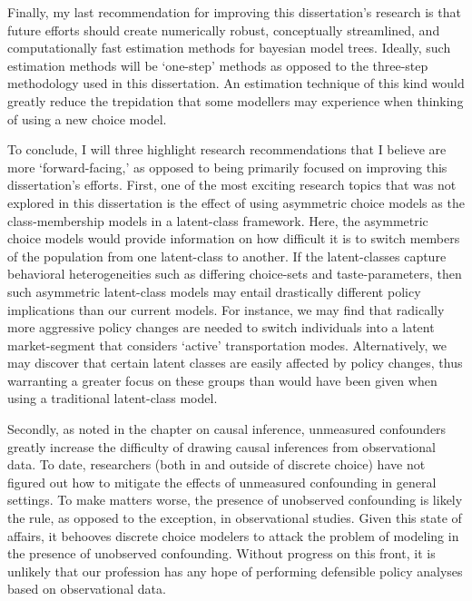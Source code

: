 Finally, my last recommendation for improving this dissertation's research is that future efforts should create numerically robust, conceptually streamlined, and computationally fast estimation methods for bayesian model trees. Ideally, such estimation methods will be `one-step' methods as opposed to the three-step methodology used in this dissertation. An estimation technique of this kind would greatly reduce the trepidation that some modellers may experience when thinking of using a new choice model.

To conclude, I will three highlight research recommendations that I believe are more `forward-facing,' as opposed to being primarily focused on improving this dissertation's efforts. First, one of the most exciting research topics that was not explored in this dissertation is the effect of using asymmetric choice models as the class-membership models in a latent-class framework. Here, the asymmetric choice models would provide information on how difficult it is to switch members of the population from one latent-class to another. If the latent-classes capture behavioral heterogeneities such as differing choice-sets and taste-parameters, then such asymmetric latent-class models may entail drastically different policy implications than our current models. For instance, we may find that radically more aggressive policy changes are needed to switch individuals into a latent market-segment that considers `active' transportation modes. Alternatively, we may discover that certain latent classes are easily affected by policy changes, thus warranting a greater focus on these groups than would have been given when using a traditional latent-class model.

Secondly, as noted in the chapter on causal inference, unmeasured confounders greatly increase the difficulty of drawing causal inferences from observational data. To date, researchers (both in and outside of discrete choice) have not figured out how to mitigate the effects of unmeasured confounding in general settings. To make matters worse, the presence of unobserved confounding is likely the rule, as opposed to the exception, in observational studies. Given this state of affairs, it behooves discrete choice modelers to attack the problem of modeling in the presence of unobserved confounding. Without progress on this front, it is unlikely that our profession has any hope of performing defensible policy analyses based on observational data.

